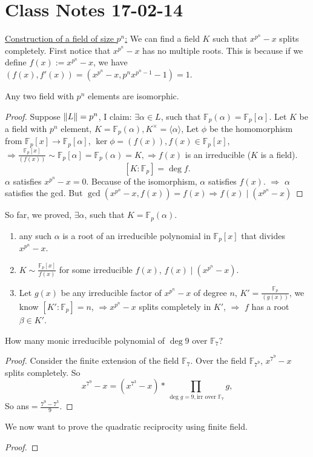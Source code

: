 \section{Class Notes 17-02-14}
\underline{Construction of a field of size $p^n$:}
We can find a field $K$ such that $x^{p^n}-x$ splits completely. First notice that $x^{p^n}-x$ has no multiple roots. This is because if we define $f(x):=x^{p^n}-x$, we have $(f(x), f'(x)) = (x^{p^n}-x, p^nx^{p^n-1}-1) = 1$.
\begin{theorem}
Any two field with $p^n$ elements are isomorphic.
\end{theorem}
\begin{proof}
Suppose $\|L\| = p^n$, I claim: $\exists\alpha\in L$, such that $\mathbb{F}_p(\alpha)=\mathbb{F}_p[\alpha]$. Let $K$ be a field with $p^n$ element, $K=\mathbb{F}_p(\alpha), K^{\times}=\langle\alpha\rangle
$, Let $\phi$ be the homomorphism from $\mathbb{F}_p[x]\rightarrow \mathbb{F}_p[\alpha]$, $\ker{\phi}=(f(x)), f(x)\in \mathbb{F}_p[x]$, $\Rightarrow \frac{\mathbb{F}_p[x]}{(f(x))}\sim \mathbb{F}_p[\alpha]=\mathbb{F}_p(\alpha)=K,\Rightarrow f(x)$ is an irreducible ($K$ is a field).$$[K:\mathbb{F}_p]=\deg{f}.$$ $\alpha$ satisfies $x^{p^n}-x=0$. Because of the isomorphism, $\alpha$ satisfies $f(x)$. $\Rightarrow$ $\alpha$ satisfies the gcd. But $\gcd(x^{p^n}-x, f(x)) =f(x)\Rightarrow f(x)\mid (x^{p^n}-x)$
\end{proof} 
So far, we proved, $\exists\alpha$, such that $K=\mathbb{F}_p(\alpha)$.
\begin{enumerate}
	\item any such $\alpha$ is a root of an irreducible polynomial in $\mathbb{F}_p[x]$ that divides $x^{p^n}-x$.
	\item $K\sim \frac{\mathbb{F}_p[x]}{f(x)}$ for some irreducible $f(x)$, $f(x)\mid (x^{p^n}-x)$.
	\item Let $g(x)$ be any irreducible factor of $x^{p^n}-x$ of degree $n$, $K' = \frac{\mathbb{F}_p}{(g(x))}$, we know $[K': \mathbb{F}_p]=n$, $\Rightarrow x^{p^n}-x$ splits completely in $K'$, $\Rightarrow$ $f$ has a root $\beta\in K'$.
\end{enumerate}
\begin{exercise}
How many monic irreducible polynomial of $\deg 9$ over $\mathbb{F}_7$? 
\end{exercise}
\begin{proof}
Consider the finite extension of the field $\mathbb{F}_7$. Over the field $\mathbb{F}_{7^9}$, $x^{7^9}-x$ splits completely. So$$ x^{7^9}-x=(x^{7^3}-x)* \prod_{\deg{g}=9, \mbox{irr over }\mathbb{F}_7} g,$$ So ans$=\frac{7^9-7^3}{9}$.
\end{proof}
We now want to prove the quadratic reciprocity using finite field.
\begin{proof}
\notcomplete
\end{proof}